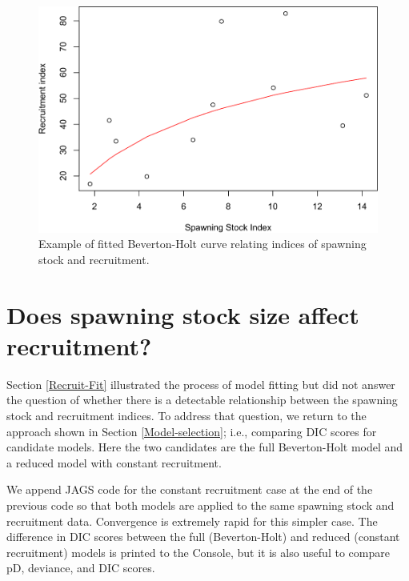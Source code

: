 \documentclass[
]{krantz}
\begin{document}
\begin{figure}
\includegraphics[width=0.9\linewidth]{bookdown_files/figure-latex/SRRPlot-1} \caption{Example of fitted Beverton-Holt curve relating indices of spawning stock and recruitment.}\label{fig:SRRPlot}
\end{figure}

\hypertarget{Recruit-DIC}{%
\section{Does spawning stock size affect recruitment?}\label{Recruit-DIC}}

Section \ref{Recruit-Fit} illustrated the process of model fitting but did not answer the question of whether there is a detectable relationship between the spawning stock and recruitment indices. To address that question, we return to the approach shown in Section \ref{Model-selection}; i.e., comparing DIC scores for candidate models. Here the two candidates are the full Beverton-Holt model and a reduced model with constant recruitment.

We append JAGS code for the constant recruitment case at the end of the previous code so that both models are applied to the same spawning stock and recruitment data. Convergence is extremely rapid for this simpler case. The difference in DIC scores between the full (Beverton-Holt) and reduced (constant recruitment) models is printed to the Console, but it is also useful to compare pD, deviance, and DIC scores.
\end{document}
